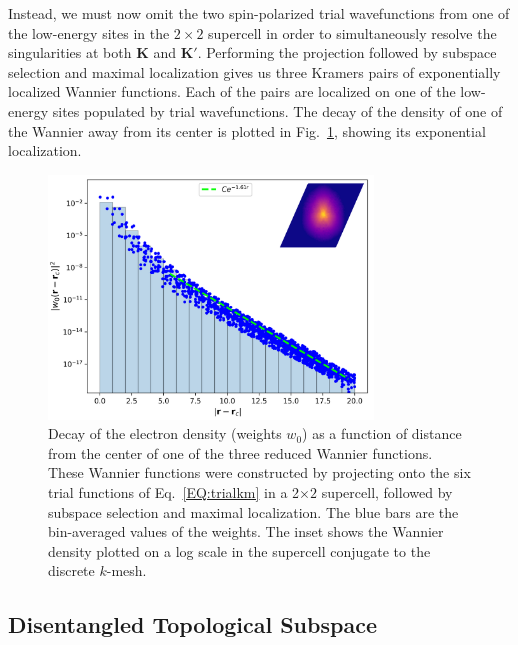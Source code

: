 \documentclass[galley,aps,pra,10pt,amsmath,amssymb,
    superscriptaddress,nofootinbib,longbibliography]{revtex4-2}
\begin{document}
Instead, we must now omit the two spin-polarized trial wavefunctions from one of the low-energy sites in the $2\times2$ supercell in order to simultaneously resolve the singularities at both $\mathbf{K}$ and $\mathbf{K'}$. Performing the projection followed by subspace selection and maximal localization gives us three Kramers pairs of exponentially localized Wannier functions. Each of the pairs are localized on one of the low-energy sites populated by trial wavefunctions. The decay of the density of one of the Wannier away from its center is plotted in Fig.~\ref{FIG12}, showing its exponential localization.


\begin{figure}[t!]
\begin{center}
\includegraphics[width=3.4in]{fig12.png}
\end{center}
\vspace{-5mm}
\caption{Decay of the electron density (weights $w_0$) as a function of distance from the center of one of the three reduced Wannier functions. These Wannier functions were constructed by projecting onto the six trial functions of Eq.~\ref{EQ:trialkm} in a 2$\times 2$ supercell, followed by subspace selection and maximal localization. The blue bars are the bin-averaged values of the weights. The inset shows the Wannier density plotted on a log scale in the supercell conjugate to the discrete $k$-mesh.}
\label{FIG12}
\end{figure}

\subsection{Disentangled Topological Subspace}
\end{document}
